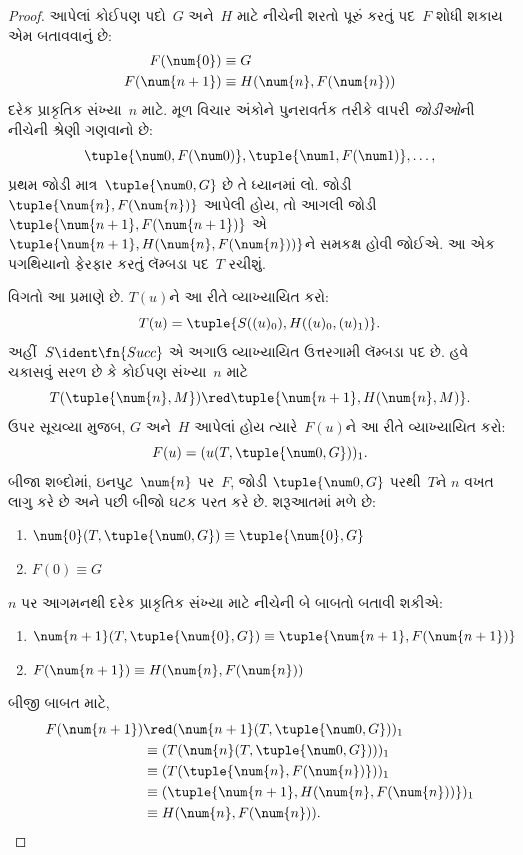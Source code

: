 \begin{proof}
આપેલાં કોઈપણ પદો~$G$ અને~$H$ માટે નીચેની શરતો પૂરું કરતું
પદ~$F$ શોધી શકાય એમ બતાવવાનું છે:
\begin{align*}
F(\num{0}) & \equiv G \\
F(\num{n+1}) & \equiv H(\num{n}, F(\num{n}))
\end{align*}
દરેક પ્રાકૃતિક સંખ્યા~$n$ માટે. મૂળ વિચાર અંકોને પુનરાવર્તક તરીકે
વાપરી \emph{જોડીઓ}ની નીચેની શ્રેણી ગણવાનો છે:
\[
\tuple{\num 0, F(\num 0)}, \tuple{\num 1, F(\num 1)}, \dots,
\]
પ્રથમ જોડી માત્ર~$\tuple{\num 0, G}$ છે તે ધ્યાનમાં લો. જોડી
$\tuple{\num{n}, F(\num{n})}$ આપેલી હોય, તો આગલી જોડી
$\tuple{\num{n+1}, F(\num{n+1})}$ એ
$\tuple{\num{n+1}, H(\num{n}, F(\num{n}))}$ને સમકક્ષ હોવી
જોઈએ. આ એક પગથિયાનો ફેરફાર કરતું લૅમ્બડા પદ~$T$ રચીશું.

વિગતો આ પ્રમાણે છે. $T(u)$ને આ રીતે વ્યાખ્યાયિત કરો:
\[
T(u) = \tuple{S((u)_0), H((u)_0,(u)_1)}.
\]
અહીં~$S\ident\fn{Succ}$ એ અગાઉ વ્યાખ્યાયિત ઉત્તરગામી લૅમ્બડા પદ છે.
હવે ચકાસવું સરળ છે કે કોઈપણ સંખ્યા~$n$ માટે
\[
T(\tuple{\num{n}, M}) \red \tuple{\num{n+1}, H(\num{n}, M)}.
\]
ઉપર સૂચવ્યા મુજબ, $G$ અને~$H$ આપેલાં હોય ત્યારે~$F(u)$ને
આ રીતે વ્યાખ્યાયિત કરો:
\[
F(u) = (u(T,\tuple{\num 0, G}))_1.
\]
બીજા શબ્દોમાં, ઇનપુટ~$\num{n}$ પર~$F$, જોડી
$\tuple{\num 0, G}$ પરથી~$T$ને $n$ વખત લાગુ કરે છે અને પછી
બીજો ઘટક પરત કરે છે. શરૂઆતમાં મળે છે:
\begin{enumerate}
\item $\num{0} (T, \tuple{\num 0, G}) \equiv \tuple{\num{0}, G}$
\item $F(\num{0}) \equiv G$
\end{enumerate}
$n$ પર આગમનથી દરેક પ્રાકૃતિક સંખ્યા માટે નીચેની બે બાબતો
બતાવી શકીએ:
\begin{enumerate}
\item $\num{n+1}(T, \tuple{\num{0}, G}) \equiv \tuple{\num{n+1}, F(\num{n+1})}$
\item $F(\num{n+1}) \equiv H(\num{n}, F(\num{n}))$
\end{enumerate}
બીજી બાબત માટે,
\begin{align*}
F(\num{n+1}) & \red (\num{n+1}(T, \tuple{\num 0, G}))_1 \\
& \equiv (T(\num{n} (T, \tuple{\num 0, G})))_1 \\
& \equiv (T(\tuple{\num{n}, F(\num{n})}))_1 \\
& \equiv (\tuple{\num{n+1}, H(\num{n}, F(\num{n}))})_1 \\
& \equiv H(\num{n}, F(\num{n})).
\end{align*}

\end{proof}

